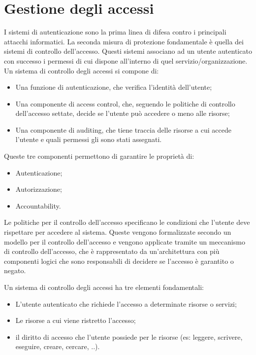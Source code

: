 \chapter{Gestione degli accessi}
I sistemi di autenticazione sono la prima linea di difesa contro i principali attacchi informatici. 
La seconda misura di protezione fondamentale è quella dei sistemi di controllo dell'accesso. Questi sistemi associano ad un utente autenticato con successo i permessi di cui dispone all'interno di quel servizio/organizzazione.
\\

\noindent Un sistema di controllo degli accessi si compone di:
\begin{itemize}
    \item Una funzione di autenticazione, che verifica l'identità dell'utente;
    \item Una componente di access control, che, seguendo le politiche di controllo dell'accesso settate, decide se l'utente può accedere o meno alle risorse;
    \item Una componente di auditing, che tiene traccia delle risorse a cui accede l'utente e quali permessi gli sono stati assegnati. 
\end{itemize}

\noindent Queste tre componenti permettono di garantire le proprietà di:
\begin{itemize}
    \item Autenticazione;
    \item Autorizzazione;
    \item Accountability.
\end{itemize}    

\noindent Le politiche per il controllo dell'accesso specificano le condizioni che l'utente deve rispettare per accedere al sistema. Queste vengono formalizzate secondo un modello per il controllo dell'accesso e vengono applicate tramite un meccanismo di controllo dell'accesso, che è rappresentato da un'architettura con più componenti logici che sono responsabili di decidere se l'accesso è garantito o negato.

\noindent Un sistema di controllo degli accessi ha tre elementi fondamentali:
\begin{itemize}
    \item L'utente autenticato che richiede l'accesso a determinate risorse o servizi;
    \item Le risorse a cui viene ristretto l'accesso;
    \item il diritto di accesso che l'utente possiede per le risorse (es: leggere, scrivere, eseguire, creare, cercare, ..).
\end{itemize}

